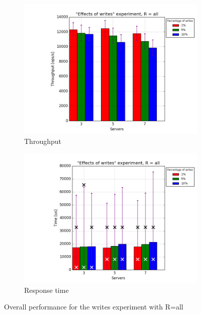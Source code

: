 \documentclass[11pt]{article}
\begin{document}
\begin{figure}
\centering
\begin{subfigure}{.5\textwidth}
	\centering
	\includegraphics[width=\linewidth]{plots/writes-2-replication}
	\caption{Throughput}
	\label{fig:writes-throughput-2}
\end{subfigure}%
\begin{subfigure}{.5\textwidth}
	\centering
	\includegraphics[width=\linewidth]{plots/writes-response_time-2-replication}
	\caption{Response time}
	\label{fig:writes-reponse-time-2}
\end{subfigure}
\caption{Overall performance for the writes experiment with R=all}
\label{fig:writes-overall}
\end{figure}
\end{document}
